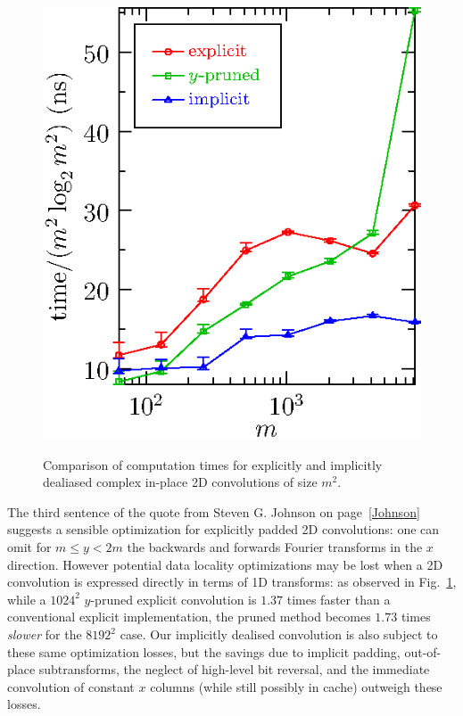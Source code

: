 \documentclass[final]{siamltex}
\begin{document}
\begin{figure}[htbp]
\begin{center}
\includegraphics{timing2c}
\caption{Comparison of computation times for explicitly and implicitly
dealiased complex in-place 2D convolutions of size $m^2$.}
\label{timing2c}
\end{center}
\end{figure}

The third sentence of the quote from Steven G. Johnson on
page~\ref{Johnson} suggests a sensible optimization for
explicitly padded 2D convolutions: one can omit for $m \le y < 2m$
the backwards and forwards Fourier transforms in the $x$ direction.
However potential data locality optimizations may be lost
when a 2D convolution is expressed directly in terms of 1D transforms: as
observed in Fig.~\ref{timing2c}, while a $1024^2$ $y$-pruned explicit
convolution is $1.37$ times faster than a conventional explicit
implementation, the pruned method becomes $1.73$ times {\it slower} for the
$8192^2$ case. Our implicitly dealised convolution is also subject
to these same optimization losses, but the savings due to implicit padding,
out-of-place subtransforms, the neglect of high-level bit reversal, and the
immediate convolution of constant $x$ columns (while still possibly in
cache) outweigh these losses.
\end{document}
